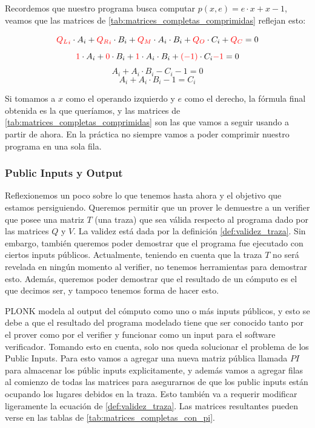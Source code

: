 Recordemos que nuestro programa busca computar $p(x,e) = e \cdot x + x - 1$, veamos que las matrices de \ref{tab:matrices_completas_comprimidas} reflejan esto:

\begin{samepage}
$$\textcolor{red}{{Q_L}_i} \cdot A_i + \textcolor{red}{{Q_R}_i} \cdot B_i + \textcolor{red}{Q_M}\cdot A_i\cdot B_i + \textcolor{red}{Q_O}\cdot C_i + \textcolor{red}{Q_C} = 0$$
$$\textcolor{red}{1} \cdot A_i + \textcolor{red}{0} \cdot B_i + \textcolor{red}{1}\cdot A_i\cdot B_i + \textcolor{red}{(-1)} \cdot C_i \textcolor{red}{-1} = 0$$
$$A_i + A_i\cdot B_i -C_i - 1 = 0$$
$$A_i + A_i\cdot B_i - 1 = C_i$$
\end{samepage}

Si tomamos a $x$ como el operando izquierdo y $e$ como el derecho, la fórmula final obtenida es la que queríamos, y las matrices de \ref{tab:matrices_completas_comprimidas} son las que vamos a seguir usando a partir de ahora. En la práctica no siempre vamos a poder comprimir nuestro programa en una sola fila. 

\vspace{1em}

\subsubsection{\textbf{Public Inputs y Output}}

Reflexionemos un poco sobre lo que tenemos hasta ahora y el objetivo que estamos persiguiendo. Queremos permitir que un prover le demuestre a un verifier que posee una matriz $T$ (una traza) que sea válida respecto al programa dado por las matrices $Q$ y $V$. La validez está dada por la definición \ref{def:validez_traza}. Sin embargo, también queremos poder demostrar que el programa fue ejecutado con ciertos inputs públicos. Actualmente, teniendo en cuenta que la traza $T$ no será revelada en ningún momento al verifier, no tenemos herramientas para demostrar esto. Además, queremos poder demostrar que el resultado de un cómputo es el que decimos ser, y tampoco tenemos forma de hacer esto. 

PLONK modela al output del cómputo como uno o más inputs públicos, y esto se debe a que el resultado del programa modelado tiene que ser conocido tanto por el prover como por el verifier y funcionar como un input para el software verificador. Tomando esto en cuenta, solo nos queda solucionar el problema de los Public Inputs. Para esto vamos a agregar una nueva matriz pública llamada $PI$ para almacenar los públic inputs explicitamente, y además vamos a agregar filas al comienzo de todas las matrices para asegurarnos de que los public inputs están ocupando los lugares debidos en la traza. Esto también va a requerir modificar ligeramente la ecuación de \ref{def:validez_traza}. Las matrices resultantes pueden verse en las tablas de \ref{tab:matrices_completas_con_pi}.

